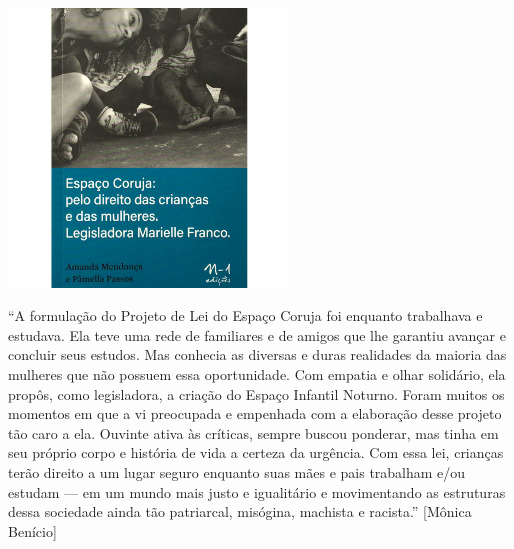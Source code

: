 \pagebreak %

\begin{center}

\hspace*{.5cm}\includegraphics[width=74mm]{./grid/coruja.jpg}
\end{center}

\hspace*{-7cm}\hrulefill\hspace*{-7cm}

\medskip

\noindent{}“A formulação do Projeto de Lei do Espaço Coruja foi  enquanto trabalhava e estudava. Ela teve uma rede de familiares e de amigos que lhe garantiu avançar e concluir seus estudos. Mas conhecia as diversas e duras realidades da maioria das mulheres que não possuem essa oportunidade. Com empatia e olhar solidário, ela propôs, como legisladora, a criação do Espaço Infantil Noturno. Foram muitos os momentos em que a vi preocupada e empenhada com a elaboração desse projeto tão caro a ela. Ouvinte ativa às críticas, sempre buscou ponderar, mas tinha em seu próprio corpo e história de vida a certeza da urgência. Com essa lei, crianças terão direito a um lugar seguro enquanto suas mães e pais trabalham e/ou estudam --- em um mundo mais justo e igualitário e movimentando as estruturas dessa sociedade ainda tão patriarcal, misógina, machista e racista.” [Mônica Benício]


\vfill

\hspace*{-.4cm}\begin{minipage}[c]{1\linewidth}
\small{
{}}
\end{minipage}

